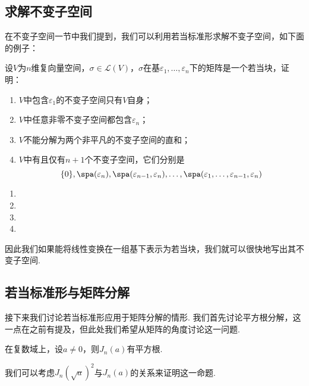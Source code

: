 \subsection{求解不变子空间}
在不变子空间一节中我们提到，我们可以利用若当标准形求解不变子空间，如下面的例子：
\begin{example}
    设$V$为$n$维复向量空间，$\sigma\in \mathcal{L}(V)$，$\sigma$在基$\varepsilon_1,\ldots,\varepsilon_n$下的矩阵是一个若当块，证明：
    \begin{enumerate}
        \item $V$中包含$\varepsilon_1$的不变子空间只有$V$自身；

        \item $V$中任意非零不变子空间都包含$\varepsilon_n$；

        \item $V$不能分解为两个非平凡的不变子空间的直和；

        \item $V$中有且仅有$n+1$个不变子空间，它们分别是
              \[\{0\},\spa(\varepsilon_n),\spa(\varepsilon_{n-1},\varepsilon_n),\ldots,\spa(\varepsilon_1,\ldots,\varepsilon_{n-1},\varepsilon_n)\]
    \end{enumerate}
\end{example}

\begin{solution}
    \begin{enumerate}
        \item

        \item

        \item

        \item
    \end{enumerate}
\end{solution}

因此我们如果能将线性变换在一组基下表示为若当块，我们就可以很快地写出其不变子空间.

\subsection{若当标准形与矩阵分解}
接下来我们讨论若当标准形应用于矩阵分解的情形. 我们首先讨论平方根分解，这一点在之前有提及，但此处我们希望从矩阵的角度讨论这一问题.
\begin{theorem}
    在复数域上，设$a\neq 0$，则$J_n(a)$有平方根.
\end{theorem}
我们可以考虑$J_n(\sqrt{a})^2$与$J_n(a)$的关系来证明这一命题.

